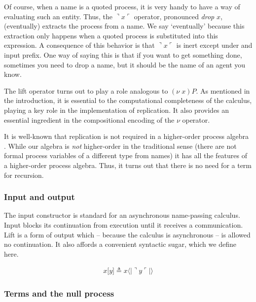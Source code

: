 \documentclass[]{entcs}
\newcommand{\lliftb}{\langle\!|}
\newcommand{\rliftb}{|\!\rangle}
\newcommand{\lpquote}{\ulcorner}
\newcommand{\rpquote}{\urcorner}
\newcommand{\id}[1]{\texttt{#1}}
\newcommand{\lift}[2]{#1 \lliftb #2 \rliftb}
\newcommand{\dropn}[1]{\rpquote #1 \lpquote}
\begin{document}
Of course, when a name is a quoted process, it is very handy to have a
way of evaluating such an entity. Thus, the $\dropn{x}$ operator,
pronounced \textit{drop} $x$, (eventually) extracts the process from a
name. We say `eventually' because this extraction only happens when a
quoted process is substituted into this expression. A consequence of
this behavior is that $\dropn{x}$ is inert except under and input
prefix. One way of saying this is that if you want to get something
done, sometimes you need to drop a name, but it should be the name of
an agent you know.

\begin{remark} %
The lift operator turns out to play a role analogous to $(\nu \;
x)P$. As mentioned in the introduction, it is essential to the
computational completeness of the calculus, playing a key role in the
implementation of replication. It also provides an essential
ingredient in the compositional encoding of the $\nu$ operator.
\end{remark}

\begin{remark} %
It is well-known that replication is not required in a higher-order
process algebra \cite{SangiorgiWalker}. While our algebra is
\textit{not} higher-order in the traditional sense (there are not
formal process variables of a different type from names) it has all
the features of a higher-order process algebra. Thus, it turns out
that there is no need for a term for recursion. 
\end{remark}

\subsubsection{Input and output}

The input constructor is standard for an asynchronous name-passing
calculus. Input blocks its continuation from execution until it
receives a communication. Lift is a form of output which -- because
the calculus is asynchronous -- is allowed no continuation. It also
affords a convenient syntactic sugar, which we define here.

\begin{eqnarray}
	{x}\id{[}{y}\id{]} \triangleq \lift{x}{\dropn{y}} \nonumber
\end{eqnarray}

\subsubsection{Terms and the null process}
\end{document}

